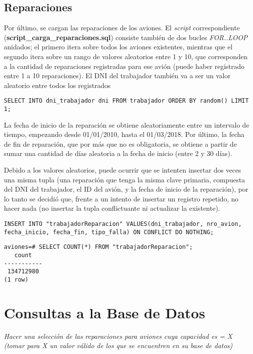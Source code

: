\subsection{Reparaciones}
Por último, se cargan las reparaciones de los aviones. El \emph{script} correspondiente (\textbf{script\_carga\_reparaciones.sql}) consiste también de dos bucles \emph{FOR..LOOP} anidados; el primero itera sobre todos los aviones existentes, mientras que el segundo itera sobre un rango de valores aleatorios entre 1 y 10, que corresponden a la cantidad de reparaciones registradas para ese avión (puede haber registrado entre 1 a 10 reparaciones). El DNI del trabajador también va a ser un valor aleatorio entre todos los registrados
\vspace*{5mm}
\lstset{style=sql}
\begin{lstlisting}
SELECT INTO dni_trabajador dni FROM trabajador ORDER BY random() LIMIT 1;
\end{lstlisting}

La fecha de inicio de la reparación se obtiene aleatoriamente entre un intervalo de tiempo, empezando desde 01/01/2010, hasta el 01/03/2018. Por último, la fecha de fin de reparación, que por más que no es obligatoria, se obtiene a partir de sumar una cantidad de días aleatoria a la fecha de inicio (entre 2 y 30 días).

Debido a los valores aleatorios, puede ocurrir que se intenten insertar dos veces una misma tupla (una reparación que tenga la misma clave primaria, compuesta del DNI del trabajador, el ID del avión, y la fecha de inicio de la reparación), por lo tanto se decidió que, frente a un intento de insertar un registro repetido, no hacer nada (no insertar la tupla conflictuante ni actualizar la existente).

\vspace*{5mm}
\lstset{style=sql}
\begin{lstlisting}
INSERT INTO "trabajadorReparacion" VALUES(dni_trabajador, nro_avion, fecha_inicio, fecha_fin, tipo_falla) ON CONFLICT DO NOTHING;
\end{lstlisting}

\lstset{style=sql}
\begin{lstlisting}
aviones=# SELECT COUNT(*) FROM "trabajadorReparacion";
   count   
-----------
 134712980
(1 row)
\end{lstlisting}

\section{Consultas a la Base de Datos}
\emph{Hacer una selección de las reparaciones para aviones cuya capacidad es = X (tomar para X un valor válido de los que se encuentren en su base de datos)}

